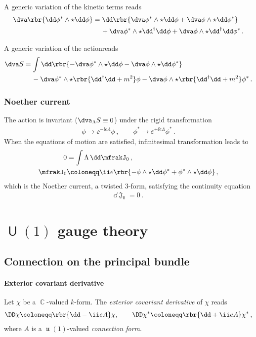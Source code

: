 \documentclass[a4paper]{article}
\begin{document}
A generic variation of the kinetic terms reads
\begin{align}
\begin{split}
\dva \rbr{\dd \phi^*\wedge\star\dd\phi} &= 
\dd\rbr{\dva\phi^*\wedge\star\dd\phi + \dva\phi\wedge\star\dd\phi^*}
\\
&\quad\,+
\dva\phi^*\wedge\star\dd^{\dagger}\dd\phi +
\dva\phi\wedge\star\dd^{\dagger}\dd\phi^*\,.
\end{split}
\end{align}

A generic variation of the actionreads
\begin{align}
\dva S &=
\int \dd\rbr{-\dva\phi^*\wedge\star\dd\phi -
\dva\phi\wedge\star\dd\phi^*}
\nonumber \\
&\quad\,-
\dva\phi^*\wedge\star\rbr{\dd^{\dagger}\dd+m^2}\phi -
\dva\phi\wedge\star\rbr{\dd^{\dagger}\dd+m^2}\phi^*\,.
\end{align}


\subsubsection{Noether current}
The action is invariant ($\dva_{\Lambda} S \equiv 0$) under the rigid 
transformation
\begin{align}
\phi \to \ee^{-\ii e \Lambda} \phi\,,\qquad
\phi^* \to \ee^{+\ii e \Lambda} \phi^*\,.
\end{align}
When the equations of motion are satisfied, infinitesimal 
transformation leads to
\begin{align}
0 &= \int \Lambda\, \dd \mfrakJ_0\,,
\nonumber \\
\mfrakJ_0 &\coloneqq \ii e\rbr{- \phi\wedge\star\dd\phi^* +
	\phi^*\wedge\star\dd\phi}\,,
\end{align}
which is the Noether current, a twisted $3$-form, satisfying the continuity 
equation
\begin{align}
\dd \mfrakJ_0 = 0\,.
\end{align}

\section[$U(1)$ gauge theory]{$\msansU(1)$ gauge theory}

\subsection{Connection on the principal bundle}

\paragraph{Exterior covariant derivative}
Let $\chi$ be a $\BbbC$-valued $k$-form. The \emph{exterior covariant derivative} of 
$\chi$ reads
\begin{align}
\DD\chi \coloneqq \rbr{\dd - \ii e A}\chi,
\qquad
\DD\chi^* \coloneqq \rbr{\dd + \ii e A}\chi^*\,,
\end{align}
where $A$ is a $\mfraku(1)$-valued \emph{connection form}.
\end{document}
